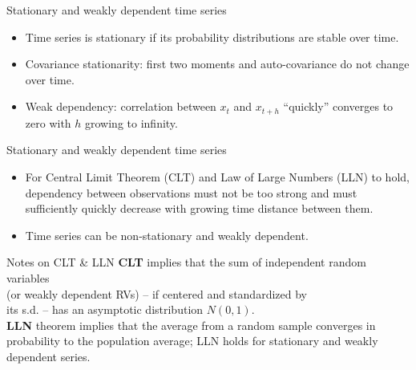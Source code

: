 \documentclass{beamer}
\begin{document}

\begin{frame}{Stationary and weakly dependent time series}
\begin{itemize}
\item Time series is stationary if its probability distributions are stable over time.

\vspace{0.5cm}

\item Covariance stationarity: first two moments and auto-covariance do not change over time.

\vspace{0.5cm}

\item Weak dependency: correlation between $x_t$ and $x_{t+h}$ ``quickly'' converges to zero with $h$ growing to infinity.
\end{itemize}
\end{frame}


\begin{frame}{Stationary and weakly dependent time series}
\begin{itemize}
\item For Central Limit Theorem (CLT) and Law of Large Numbers (LLN) to hold, dependency between observations must not be too strong and must sufficiently quickly decrease with growing time distance between them.

\vspace{0.5cm}

\item Time series can be non-stationary and weakly dependent.
\end{itemize}

\begin{block}{Notes on CLT \& LLN}
\textbf{CLT} implies that the sum of independent random variables \\(or weakly dependent RVs) -- if centered and standardized by \\its s.d. -- has an asymptotic distribution $N(0,1)$.\\ \vspace{0.1cm}
\textbf{LLN} theorem implies that the average from a random sample converges in probability to the population average; LLN holds for stationary and weakly dependent series.
\end{block}

\end{frame}
\end{document}
